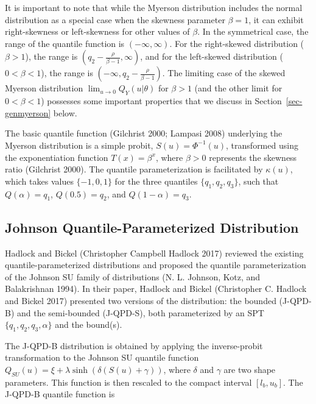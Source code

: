 \documentclass[
]{interact}
\begin{document}
It is important to note that while the Myerson distribution includes the
normal distribution as a special case when the skewness parameter
\(\beta = 1\), it can exhibit right-skewness or left-skewness for other
values of \(\beta\). In the symmetrical case, the range of the quantile
function is \((-\infty, \infty)\). For the right-skewed distribution
(\(\beta > 1\)), the range is
\((q_2 - \frac{\rho}{\beta - 1}, \infty)\), and for the left-skewed
distribution (\(0 < \beta < 1\)), the range is
\((-\infty, q_2 - \frac{\rho}{\beta - 1})\). The limiting case of the
skewed Myerson distribution \(\lim_{u \rightarrow 0} Q_Y(u\vert\theta)\)
for \(\beta > 1\) (and the other limit for \(0 < \beta < 1\)) possesses
some important properties that we discuss in
Section~\ref{sec-genmyerson} below.

The basic quantile function (Gilchrist 2000; Lampasi 2008) underlying
the Myerson distribution is a simple probit, \(S(u) = \Phi^{-1}(u)\),
transformed using the exponentiation function \(T(x) = \beta^{x}\),
where \(\beta > 0\) represents the skewness ratio (Gilchrist 2000). The
quantile parameterization is facilitated by \(\kappa(u)\), which takes
values \(\{-1,0,1\}\) for the three quantiles \(\{q_1, q_2, q_3\}\),
such that \(Q(\alpha) = q_1\), \(Q(0.5) = q_2\), and
\(Q(1 - \alpha) = q_3\).

\subsection{Johnson Quantile-Parameterized
Distribution}\label{johnson-quantile-parameterized-distribution}

Hadlock and Bickel (Christopher Campbell Hadlock 2017) reviewed the
existing quantile-parameterized distributions and proposed the quantile
parameterization of the Johnson SU family of distributions (N. L.
Johnson, Kotz, and Balakrishnan 1994). In their paper, Hadlock and
Bickel (Christopher C. Hadlock and Bickel 2017) presented two versions
of the distribution: the bounded (J-QPD-B) and the semi-bounded
(J-QPD-S), both parameterized by an SPT \(\{q_1, q_2, q_3, \alpha\}\)
and the bound(s).

The J-QPD-B distribution is obtained by applying the inverse-probit
transformation to the Johnson SU quantile function
\(Q_{SU}(u) = \xi + \lambda\sinh(\delta(S(u) + \gamma))\), where
\(\delta\) and \(\gamma\) are two shape parameters. This function is
then rescaled to the compact interval \([l_b, u_b]\). The J-QPD-B
quantile function is
\end{document}
